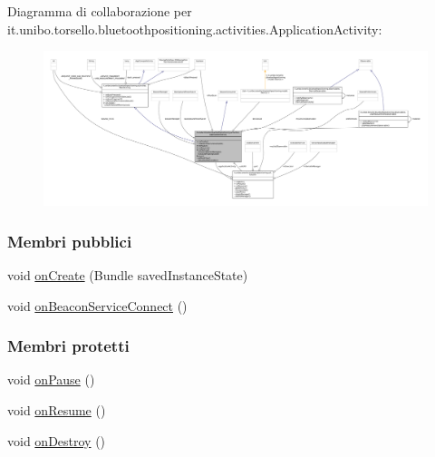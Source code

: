 Diagramma di collaborazione per it.\+unibo.\+torsello.\+bluetoothpositioning.\+activities.\+Application\+Activity\+:
\nopagebreak
\begin{figure}[H]
\begin{center}
\leavevmode
\includegraphics[width=350pt]{classit_1_1unibo_1_1torsello_1_1bluetoothpositioning_1_1activities_1_1ApplicationActivity__coll__graph}
\end{center}
\end{figure}
\subsubsection*{Membri pubblici}
\begin{DoxyCompactItemize}
\item 
void \hyperlink{classit_1_1unibo_1_1torsello_1_1bluetoothpositioning_1_1activities_1_1ApplicationActivity_a395bfa7ec016998b254b9e197ef8d754_a395bfa7ec016998b254b9e197ef8d754}{on\+Create} (Bundle saved\+Instance\+State)
\item 
void \hyperlink{classit_1_1unibo_1_1torsello_1_1bluetoothpositioning_1_1activities_1_1ApplicationActivity_a0cdfc0658ba462b43e9e6b94bab90da1_a0cdfc0658ba462b43e9e6b94bab90da1}{on\+Beacon\+Service\+Connect} ()
\end{DoxyCompactItemize}
\subsubsection*{Membri protetti}
\begin{DoxyCompactItemize}
\item 
void \hyperlink{classit_1_1unibo_1_1torsello_1_1bluetoothpositioning_1_1activities_1_1ApplicationActivity_a06ed1cf654098045b1317b25067af877_a06ed1cf654098045b1317b25067af877}{on\+Pause} ()
\item 
void \hyperlink{classit_1_1unibo_1_1torsello_1_1bluetoothpositioning_1_1activities_1_1ApplicationActivity_ad9e5c029636aac4d7baa2ca8695b3a18_ad9e5c029636aac4d7baa2ca8695b3a18}{on\+Resume} ()
\item 
void \hyperlink{classit_1_1unibo_1_1torsello_1_1bluetoothpositioning_1_1activities_1_1ApplicationActivity_a219ab2598668ab85771f3f8e3c6fec22_a219ab2598668ab85771f3f8e3c6fec22}{on\+Destroy} ()
\end{DoxyCompactItemize}
